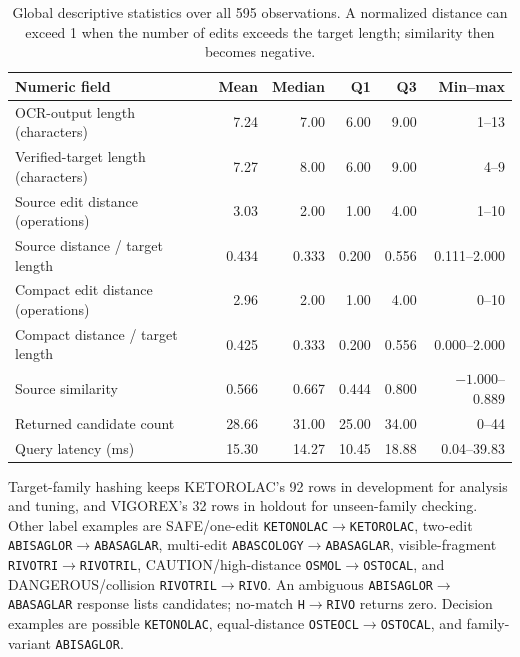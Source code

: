 \documentclass[11pt]{article}
\newcommand{\code}[1]{\texttt{#1}}
\begin{document}
\begin{table}[htbp]
\centering
\small
\begin{tabular}{@{}lrrrrr@{}}
\toprule
\textbf{Numeric field} & \textbf{Mean} & \textbf{Median} & \textbf{Q1} & \textbf{Q3} & \textbf{Min--max} \\
\midrule
OCR-output length (characters) & 7.24 & 7.00 & 6.00 & 9.00 & 1--13 \\
Verified-target length (characters) & 7.27 & 8.00 & 6.00 & 9.00 & 4--9 \\
Source edit distance (operations) & 3.03 & 2.00 & 1.00 & 4.00 & 1--10 \\
Source distance / target length & 0.434 & 0.333 & 0.200 & 0.556 & 0.111--2.000 \\
Compact edit distance (operations) & 2.96 & 2.00 & 1.00 & 4.00 & 0--10 \\
Compact distance / target length & 0.425 & 0.333 & 0.200 & 0.556 & 0.000--2.000 \\
Source similarity & 0.566 & 0.667 & 0.444 & 0.800 & $-1.000$--0.889 \\
Returned candidate count & 28.66 & 31.00 & 25.00 & 34.00 & 0--44 \\
Query latency (ms) & 15.30 & 14.27 & 10.45 & 18.88 & 0.04--39.83 \\
\bottomrule
\end{tabular}
\caption{Global descriptive statistics over all 595 observations. A normalized
distance can exceed 1 when the number of edits exceeds the target length;
similarity then becomes negative.}
\label{tab:descriptive-stats}
\end{table}

Target-family hashing keeps KETOROLAC's 92 rows in development for analysis and
tuning, and VIGOREX's 32 rows in holdout for unseen-family checking. Other label
examples are SAFE/one-edit \code{KETONOLAC}$\rightarrow$\code{KETOROLAC},
two-edit \code{ABISAGLOR}$\rightarrow$\code{ABASAGLAR}, multi-edit
\code{ABASCOLOGY}$\rightarrow$\code{ABASAGLAR}, visible-fragment
\code{RIVOTRI}$\rightarrow$\code{RIVOTRIL}, CAUTION/high-distance
\code{OSMOL}$\rightarrow$\code{OSTOCAL}, and DANGEROUS/collision
\code{RIVOTRIL}$\rightarrow$\code{RIVO}. An ambiguous
\code{ABISAGLOR}$\rightarrow$\code{ABASAGLAR} response lists candidates;
no-match \code{H}$\rightarrow$\code{RIVO} returns zero. Decision examples are
possible \code{KETONOLAC}, equal-distance
\code{OSTEOCL}$\rightarrow$\code{OSTOCAL}, and family-variant
\code{ABISAGLOR}.
\end{document}
